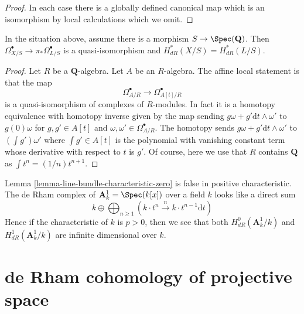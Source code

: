 \begin{proof}
In each case there is a globally defined canonical map which
is an isomorphism by local calculations which we omit.
\end{proof}

\begin{lemma}
\label{lemma-line-bundle-characteristic-zero}
In the situation above, assume there is a morphism $S \to \Spec(\mathbf{Q})$.
Then $\Omega^\bullet_{X/S} \to \pi_*\Omega^\bullet_{L/S}$ is a
quasi-isomorphism and $H_{dR}^*(X/S) = H_{dR}^*(L/S)$.
\end{lemma}

\begin{proof}
Let $R$ be a $\mathbf{Q}$-algebra. Let $A$ be an $R$-algebra.
The affine local statement is that the map
$$
\Omega^\bullet_{A/R} \longrightarrow \Omega^\bullet_{A[t]/R}
$$
is a quasi-isomorphism of complexes of $R$-modules. In fact it is a
homotopy equivalence with homotopy inverse given by the map sending
$g \omega + g' \text{d}t \wedge \omega'$ to $g(0)\omega$ for
$g, g' \in A[t]$ and $\omega, \omega' \in \Omega^\bullet_{A/R}$.
The homotopy sends $g \omega + g' \text{d}t \wedge \omega'$
to $(\int g') \omega'$ where $\int g' \in A[t]$ is the polynomial
with vanishing constant term whose derivative with respect to $t$
is $g'$. Of course, here we use that $R$ contains $\mathbf{Q}$
as $\int t^n = (1/n)t^{n + 1}$.
\end{proof}

\begin{example}
\label{example-affine-line}
Lemma \ref{lemma-line-bundle-characteristic-zero} is
false in positive characteristic. The de Rham complex of
$\mathbf{A}^1_k = \Spec(k[x])$ over a field $k$ looks like a direct sum
$$
k \oplus
\bigoplus\nolimits_{n \geq 1}
(k \cdot t^n \xrightarrow{n}
k \cdot t^{n - 1} \text{d}t)
$$
Hence if the characteristic of $k$ is $p > 0$, then
we see that both $H^0_{dR}(\mathbf{A}^1_k/k)$ and
$H^1_{dR}(\mathbf{A}^1_k/k)$
are infinite dimensional over $k$.
\end{example}








\section{de Rham cohomology of projective space}
\label{section-projective-space}

